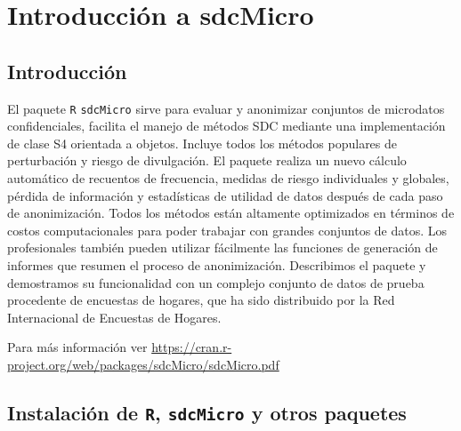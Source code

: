 \documentclass[]{book}
\theoremstyle{definition}
\theoremstyle{definition}
\theoremstyle{definition}
\theoremstyle{definition}
\theoremstyle{remark}
\begin{document}
\hypertarget{introducciuxf3n-a-sdcmicro}{%
\chapter{Introducción a sdcMicro}\label{introducciuxf3n-a-sdcmicro}}

\hypertarget{introducciuxf3n-1}{%
\section{Introducción}\label{introducciuxf3n-1}}

El paquete \texttt{R} \texttt{sdcMicro} \citet{templ2015} sirve para evaluar y anonimizar conjuntos de microdatos confidenciales, facilita el manejo de métodos SDC mediante una implementación de clase S4 orientada a objetos. Incluye todos los métodos populares de perturbación y riesgo de divulgación. El paquete realiza un nuevo cálculo automático de recuentos de frecuencia, medidas de riesgo individuales y globales, pérdida de información y estadísticas de utilidad de datos después de cada paso de anonimización. Todos los métodos están altamente optimizados en términos de costos computacionales para poder trabajar con grandes conjuntos de datos. Los profesionales también pueden utilizar fácilmente las funciones de generación de informes que resumen el proceso de anonimización. Describimos el paquete y demostramos su funcionalidad con un complejo conjunto de datos de prueba procedente de encuestas de hogares, que ha sido distribuido por la Red Internacional de Encuestas de Hogares.

Para más información ver \url{https://cran.r-project.org/web/packages/sdcMicro/sdcMicro.pdf}

\hypertarget{instalaciuxf3n-de-r-sdcmicro-y-otros-paquetes}{%
\section{\texorpdfstring{Instalación de \texttt{R}, \texttt{sdcMicro} y otros paquetes}{Instalación de R, sdcMicro y otros paquetes}}\label{instalaciuxf3n-de-r-sdcmicro-y-otros-paquetes}}
\end{document}
